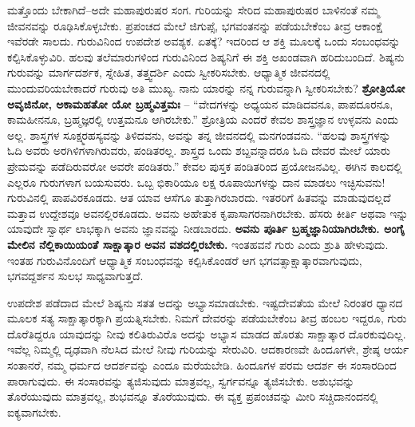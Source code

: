ಮತ್ತೊಂದು ಬೇಕಾಗಿದೆ–ಅದೇ ಮಹಾಪುರುಷರ ಸಂಗ. ಗುರಿಯನ್ನು ಸೇರಿದ ಮಹಾಪುರುಷರ ಬಾಳಿನಂತೆ ನಮ್ಮ ಜೀವನವನ್ನು ರೂಢಿಸಿಕೊಳ್ಳಬೇಕು. ಪ್ರಪಂಚದ ಮೇಲೆ ಜಿಗುಪ್ಸೆ, ಭಗವಂತನನ್ನು ಪಡೆಯಬೇಕೆಂಬ ತೀವ್ರ ಆಕಾಂಕ್ಷೆ ಇವೆರಡೇ ಸಾಲದು. ಗುರುವಿನಿಂದ ಉಪದೇಶ ಅವಶ್ಯಕ. ಏತಕ್ಕೆ? ಇದರಿಂದ ಆ ಶಕ್ತಿ ಮೂಲಕ್ಕೆ ಒಂದು ಸಂಬಂಧವನ್ನು ಕಲ್ಪಿಸಿಕೊಳ್ಳುವಿರಿ. ಹಲವು ತಲೆಮಾರುಗಳಿಂದ ಗುರುವಿನಿಂದ ಶಿಷ್ಯನಿಗೆ ಈ ಶಕ್ತಿ ಅಖಂಡವಾಗಿ ಹರಿದುಬಂದಿದೆ. ಶಿಷ್ಯನು ಗುರುವನ್ನು ಮಾರ್ಗದರ್ಶಕ, ಸ್ನೇಹಿತ, ತತ್ತ್ವದರ್ಶಿ ಎಂದು ಸ್ವೀಕರಿಸಬೇಕು. ಆಧ್ಯಾತ್ಮಿಕ ಜೀವನದಲ್ಲಿ ಮುಂದುವರಿಯಬೇಕಾದರೆ ಗುರುವು ಅತಿ ಮುಖ್ಯ. ನಾನು ಯಾರನ್ನು ನನ್ನ ಗುರುವನ್ನಾಗಿ ಸ್ವೀಕರಿಸಬೇಕು? \textbf{ಶ್ರೋತ್ರಿಯೋ ಅವೃಜಿನೋ, ಅಕಾಮಹತೋ ಯೋ ಬ್ರಹ್ಮವಿತ್ತಮಃ} – “ವೇದಗಳನ್ನು ಅಧ್ಯಯನ ಮಾಡಿದವನೂ, ಪಾಪದೂರನೂ, ಕಾಮಹೀನನೂ, ಬ್ರಹ್ಮಜ್ಞರಲ್ಲಿ ಉತ್ತಮನೂ ಆಗಿರಬೇಕು.” ಶ್ರೋತ್ರಿಯ ಎಂದರೆ ಕೇವಲ ಶಾಸ್ತ್ರಜ್ಞಾನ ಉಳ್ಳವನು ಎಂದು ಅಲ್ಲ. ಶಾಸ್ತ್ರಗಳ ಸೂಕ್ಷ್ಮರಹಸ್ಯವನ್ನು ತಿಳಿದವನು, ಅವನ್ನು ತನ್ನ ಜೀವನದಲ್ಲಿ ಮನಗಂಡವನು. “ಹಲವು ಶಾಸ್ತ್ರಗಳನ್ನು ಓದಿ ಅವರು ಅರಗಿಳಿಗಳಾಗಿರುವರು, ಪಂಡಿತರಲ್ಲ. ಶಾಸ್ತ್ರದ ಒಂದು ಶಬ್ದವನ್ನಾದರೂ ಓದಿ ದೇವರ ಮೇಲೆ ಯಾರು ಪ್ರೇಮವನ್ನು ಪಡೆದಿರುವರೋ ಅವರೇ ಪಂಡಿತರು.” ಕೇವಲ ಪುಸ್ತಕ ಪಂಡಿತರಿಂದ ಪ್ರಯೋಜನವಿಲ್ಲ. ಈಗಿನ ಕಾಲದಲ್ಲಿ ಎಲ್ಲರೂ ಗುರುಗಳಾಗ ಬಯಸುವರು. ಒಬ್ಬ ಭಿಕಾರಿಯೂ ಲಕ್ಷ ರೂಪಾಯಿಗಳನ್ನು ದಾನ ಮಾಡಲು ಇಚ್ಛಿಸುವನು! ಗುರುವಿನಲ್ಲಿ ಪಾಪವಿರಕೂಡದು. ಆತ ಯಾವ ಆಸೆಗೂ ತುತ್ತಾಗಿರಬಾರದು. ಇತರರಿಗೆ ಹಿತವನ್ನು ಮಾಡುವುದಲ್ಲದೆ ಮತ್ತಾವ ಉದ್ದೇಶವೂ ಅವನಲ್ಲಿರಕೂಡದು. ಅವನು ಅಹೇತುಕ ಕೃಪಾಸಾಗರನಾಗಿರಬೇಕು. ಹೆಸರು ಕೀರ್ತಿ ಅಥವಾ ಇನ್ನು ಯಾವುದೇ ಸ್ವಾರ್ಥ ಲಾಭಕ್ಕಾಗಿ ಅವನು ಜ್ಞಾನವನ್ನು ನೀಡಬಾರದು. \textbf{ಅವನು ಪೂರ್ತಿ ಬ್ರಹ್ಮಜ್ಞಾನಿಯಾಗಿರಬೇಕು. ಅಂಗೈ ಮೇಲಿನ ನೆಲ್ಲಿಕಾಯಿಯಂತೆ ಸಾಕ್ಷಾತ್ಕಾರ ಅವನ ವಶದಲ್ಲಿರಬೇಕು.} ಇಂತಹವನೆ ಗುರು ಎಂದು ಶ್ರುತಿ ಹೇಳುವುದು. ಇಂತಹ ಗುರುವಿನೊಂದಿಗೆ ಆಧ್ಯಾತ್ಮಿಕ ಸಂಬಂಧವನ್ನು ಕಲ್ಪಿಸಿಕೊಂಡರೆ ಆಗ ಭಗವತ್ಸಾಕ್ಷಾತ್ಕಾರವಾಗುವುದು, ಭಗವದ್ದರ್ಶನ ಸುಲಭ ಸಾಧ್ಯವಾಗುತ್ತದೆ.

ಉಪದೇಶ ಪಡೆದಾದ ಮೇಲೆ ಶಿಷ್ಯನು ಸತತ ಅದನ್ನು ಅಭ್ಯಾಸಮಾಡಬೇಕು. ಇಷ್ಟದೇವತೆಯ ಮೇಲೆ ನಿರಂತರ ಧ್ಯಾನದ ಮೂಲಕ ಸತ್ಯ ಸಾಕ್ಷಾತ್ಕಾರಕ್ಕಾಗಿ ಪ್ರಯತ್ನಿಸಬೇಕು. ನಿಮಗೆ ದೇವರನ್ನು ಪಡೆಯಬೇಕೆಂಬ ತೀವ್ರ ಹಂಬಲ ಇದ್ದರೂ, ಗುರು ದೊರೆತಿದ್ದರೂ ಯಾವುದನ್ನು ನೀವು ಕಲಿತಿರುವಿರೊ ಅದನ್ನು ಅಭ್ಯಾಸ ಮಾಡದ ಹೊರತು ಸಾಕ್ಷಾತ್ಕಾರ ದೊರಕುವುದಿಲ್ಲ. ಇವೆಲ್ಲ ನಿಮ್ಮಲ್ಲಿ ದೃಢವಾಗಿ ನೆಲಸಿದ ಮೇಲೆ ನೀವು ಗುರಿಯನ್ನು ಸೇರುವಿರಿ. ಆದಕಾರಣವೇ ಹಿಂದೂಗಳೇ, ಶ್ರೇಷ್ಠ ಆರ್ಯ ಸಂತಾನರೆ, ನಮ್ಮ ಧರ್ಮದ ಆದರ್ಶವನ್ನು ಎಂದೂ ಮರೆಯಬೇಡಿ. ಹಿಂದೂಗಳ ಪರಮ ಆದರ್ಶ ಈ ಸಂಸಾರದಿಂದ ಪಾರಾಗುವುದು. ಈ ಸಂಸಾರವನ್ನು ತ್ಯಜಿಸುವುದು ಮಾತ್ರವಲ್ಲ, ಸ್ವರ್ಗವನ್ನೂ ತ್ಯಜಿಸಬೇಕು. ಅಶುಭವನ್ನು ತೊರೆಯುವುದು ಮಾತ್ರವಲ್ಲ, ಶುಭವನ್ನೂ ತೊರೆಯುವುದು. ಈ ವ್ಯಕ್ತ ಪ್ರಪಂಚವನ್ನು ಮೀರಿ ಸಚ್ಚಿದಾನಂದನಲ್ಲಿ ಐಕ್ಯವಾಗಬೇಕು.


